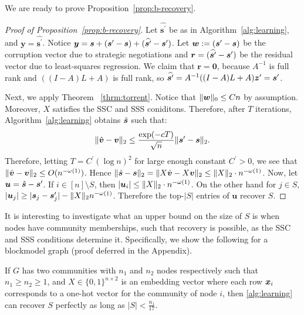 \noindent We are ready to prove Proposition~\ref{prop:b-recovery}. 


\begin{proof}[Proof of Proposition~\ref{prop:b-recovery}]
Let $\widehat{\bm{s}^\prime}$ be as in Algorithm~\ref{alg:learning}, and $\bm{y} = \widehat{\bm{s}^\prime}$. Notice $\bm{y} = \bm{s} + (\bm{s}^\prime - \bm{s}) + (\widehat{\bm{s}^\prime} - \bm{s}^\prime)$. Let $\bm{w} := (\bm{s}^\prime - \bm{s})$ be the corruption vector due to strategic negotiations and $\bm{r} =  (\widehat{\bm{s}^\prime} - \bm{s}^\prime)$ be the residual vector due to least-squares regression. We claim that $\bm{r} = \bm{0}$, because $A^{-1}$ is full rank and $((I - A) L + A)$ is full rank, so $\widehat{\bm{s}^\prime} = A^{-1} ((I - A) L + A) \bm{z}^\prime = \bm{s}^\prime$. 

Next, we apply Theorem ~\ref{thrm:torrent}. Notice that $\| \bm{w} \|_0 \leq Cn$ by assumption. Moreover, $X$ satisfies the SSC and SSS coniditons. Therefore, after $T$ iterations, Algorithm~\ref{alg:learning} obtains $\hat {\bm{s}}$ such that: 
\[
\| \hat {\bm{v}} - \bm{v} \|_2 \leq \frac{\exp(-cT)}{\sqrt{n}} \| \bm{s}^\prime - \bm{s} \|_2.
\]
Therefore, letting $T = C^\prime (\log n)^2$ for large enough constant $C^\prime > 0$, we see that $\| \hat {\bm{v}} - \bm{v} \|_2 \leq O(n^{-\omega(1)})$. Hence $\| \hat {\bm{s}} - \bm{s} \|_2 = \| X \hat {\bm{v}} - X \bm{v} \|_2 \leq \| X \|_2 \cdot n^{-\omega(1)}$. Now, let $\bm{u} = \hat {\bm{s}} - \bm{s}^\prime$. If $i \in [n] \setminus S$, then $\lvert\bm{u}_i\rvert \leq \| X \|_2 \cdot n^{-\omega(1)}$. On the other hand for $j \in S$, $\lvert\bm{u}_{j}\rvert \geq \lvert\bm{s}_j - \bm{s}_j^\prime\rvert - \| X \|_2 n^{-\omega(1)}$. Therefore the top-$|S|$ entries of $\bm{u}$ recover $S$. 
\end{proof}

It is interesting to investigate what an upper bound on the size of $S$ is when nodes have community memberships, such that recovery is possible, as the SSC and SSS conditions determine it. Specifically, we show the following for a blockmodel graph (proof deferred in the Appendix). 

\begin{prop} \label{prop:blockmodel}
    If $G$ has two communities with $n_1$ and $n_2$ nodes respectively such that $n_1 \ge n_2 \ge 1$, and $X \in \{ 0, 1 \}^{n \times 2}$ is an embedding vector where each row $\bm{x}_i$ corresponds to a one-hot vector for the community of node $i$, then \cref{alg:learning} can recover $S$ perfectly as long as $|S| < \frac {n_1} {17}$.
\end{prop}

